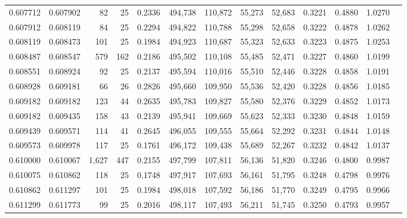 \begin{tabular}{rrrrrrrrrrrrr}
0.607712 & 0.607902 &    82 &  25 &                                     0.2336 & 494,738 & 110,872 &  55,273 &  52,683 & 0.3221 & 0.4880 & 1.0270 \\
0.607912 & 0.608119 &    84 &  25 &                                     0.2294 & 494,822 & 110,788 &  55,298 &  52,658 & 0.3222 & 0.4878 & 1.0262 \\
0.608119 & 0.608473 &   101 &  25 &                                     0.1984 & 494,923 & 110,687 &  55,323 &  52,633 & 0.3223 & 0.4875 & 1.0253 \\
0.608487 & 0.608547 &   579 & 162 &                                     0.2186 & 495,502 & 110,108 &  55,485 &  52,471 & 0.3227 & 0.4860 & 1.0199 \\
0.608551 & 0.608924 &    92 &  25 &                                     0.2137 & 495,594 & 110,016 &  55,510 &  52,446 & 0.3228 & 0.4858 & 1.0191 \\
0.608928 & 0.609181 &    66 &  26 &                                     0.2826 & 495,660 & 109,950 &  55,536 &  52,420 & 0.3228 & 0.4856 & 1.0185 \\
0.609182 & 0.609182 &   123 &  44 &                                     0.2635 & 495,783 & 109,827 &  55,580 &  52,376 & 0.3229 & 0.4852 & 1.0173 \\
0.609182 & 0.609435 &   158 &  43 &                                     0.2139 & 495,941 & 109,669 &  55,623 &  52,333 & 0.3230 & 0.4848 & 1.0159 \\
0.609439 & 0.609571 &   114 &  41 &                                     0.2645 & 496,055 & 109,555 &  55,664 &  52,292 & 0.3231 & 0.4844 & 1.0148 \\
0.609573 & 0.609978 &   117 &  25 &                                     0.1761 & 496,172 & 109,438 &  55,689 &  52,267 & 0.3232 & 0.4842 & 1.0137 \\
0.610000 & 0.610067 & 1,627 & 447 &                                     0.2155 & 497,799 & 107,811 &  56,136 &  51,820 & 0.3246 & 0.4800 & 0.9987 \\
0.610075 & 0.610862 &   118 &  25 &                                     0.1748 & 497,917 & 107,693 &  56,161 &  51,795 & 0.3248 & 0.4798 & 0.9976 \\
0.610862 & 0.611297 &   101 &  25 &                                     0.1984 & 498,018 & 107,592 &  56,186 &  51,770 & 0.3249 & 0.4795 & 0.9966 \\
0.611299 & 0.611773 &    99 &  25 &                                     0.2016 & 498,117 & 107,493 &  56,211 &  51,745 & 0.3250 & 0.4793 & 0.9957 \\

\end{tabular}
